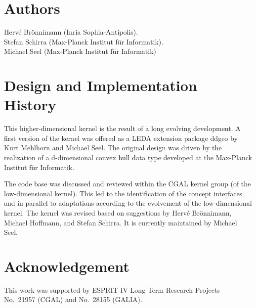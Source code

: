 \section*{Authors}

Herv\'e Br\"onnimann ({\sc Inria} Sophia-Antipolis). \\
Stefan Schirra (Max-Planck Institut f\"ur Informatik).\\
Michael Seel (Max-Planck Institut f\"ur Informatik)

\section*{Design and Implementation History}

This higher-dimensional kernel is the result of a long evolving
development. A first version of the kernel was offered as a LEDA
extension package ddgeo by Kurt Mehlhorn and Michael Seel. The
original design was driven by the realization of a d-dimensional
convex hull data type developed at the Max-Planck Institut f\"ur
Informatik.

The code base was discussed and reviewed within the CGAL kernel group
(of the low-dimensional kernel).  This led to the identification of
the concept interfaces and in parallel to adaptations according to the
evolvement of the low-dimensional kernel.  The kernel was revised
based on suggestions by Herv\'e Br\"onnimann, Michael Hoffmann, and
Stefan Schirra. It is currently maintained by Michael Seel.

\section*{Acknowledgement}

This work was supported by ESPRIT IV Long Term Research Projects
No.~21957 (CGAL) and No.~28155 (GALIA).


